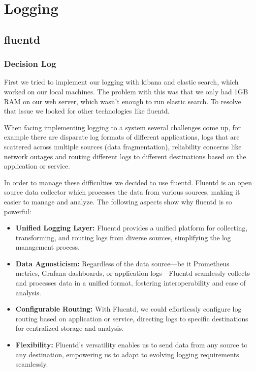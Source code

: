 \section{Logging}
\subsection{fluentd}
\subsubsection{Decision Log}
First we tried to implement our logging with kibana and elastic search, which worked on our local machines. The problem with this was that we only had 1GB RAM on our web server, 
which wasn't enough to run elastic search. To resolve that issue we looked for other technologies like fluentd. \

When facing implementing logging to a system several challenges come up, for example there are disparate log formats of different applications, 
logs that are scattered across multiple sources (data fragmentation), reliability concerns like network outages and routing different logs to different destinations 
based on the application or service. \

In order to manage these difficulties we decided to use fluentd. Fluentd is an open source data collector which processes the data from various sources, 
making it easier to manage and analyze. The following aspects show why fluentd is so powerful: 

\begin{itemize}
    \item \textbf{Unified Logging Layer:} Fluentd provides a unified platform for collecting, transforming, and routing logs from diverse sources, simplifying the log management process.
    
    \item \textbf{Data Agnosticism:} Regardless of the data source—be it Prometheus metrics, Grafana dashboards, or application logs—Fluentd seamlessly collects and processes data in a unified format, fostering interoperability and ease of analysis.
    
    \item \textbf{Configurable Routing:} With Fluentd, we could effortlessly configure log routing based on application or service, directing logs to specific destinations for centralized storage and analysis.
    
    \item \textbf{Flexibility:} Fluentd's versatility enables us to send data from any source to any destination, empowering us to adapt to evolving logging requirements seamlessly.
\end{itemize}

